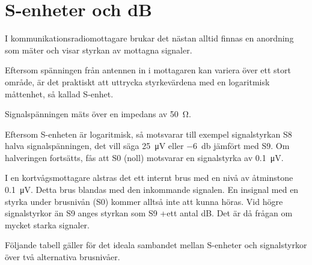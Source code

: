 \chapter{S-enheter och dB}
\label{s-enhet}

I kommunikationsradiomottagare brukar det nästan alltid finnas en anordning som
mäter och visar styrkan av mottagna signaler.

Eftersom spänningen från antennen in i mottagaren kan variera över ett stort
område, är det praktiskt att uttrycka styrkevärdena med en logaritmisk
måttenhet, så kallad S-enhet.

Signalspänningen mäts över en impedans av \SI{50}{\ohm}.

Eftersom S-enheten är logaritmisk, så motsvarar till exempel signalstyrkan S8
halva signalspänningen, det vill säga \SI{25}{\micro\volt} eller
\SI{-6}{\decibel} jämfört med S9.
Om halveringen fortsätts, fås att S0 (noll) motsvarar en signalstyrka av
\SI{0,1}{\micro\volt}.

I en kortvågsmottagare alstras det ett internt brus med en nivå av
åtminstone \SI{0,1}{\micro\volt}.
Detta brus blandas med den inkommande signalen.
En insignal med en styrka under brusnivån (S0) kommer alltså inte att
kunna höras.
Vid högre signalstyrkor än S9 anges styrkan som S9 +ett antal dB.
Det är då frågan om mycket starka signaler.

Följande tabell gäller för det ideala sambandet mellan S-enheter och
signalstyrkor över två alternativa brusnivåer.

